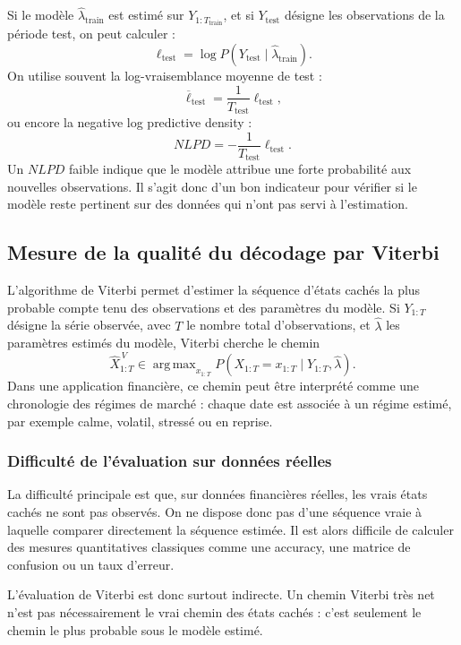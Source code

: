 \documentclass[11pt]{article}
\begin{document}
Si le modèle \(\widehat{\lambda}_{\text{train}}\) est estimé sur \(Y_{1:T_{\text{train}}}\), et si \(Y_{\text{test}}\) désigne les observations de la période test, on peut calculer :
\[
\ell_{\text{test}}
=
\log P(Y_{\text{test}}\mid \widehat{\lambda}_{\text{train}}).
\]
On utilise souvent la log-vraisemblance moyenne de test :
\[
\overline{\ell}_{\text{test}}
=
\frac{1}{T_{\text{test}}}\ell_{\text{test}},
\]
ou encore la negative log predictive density :
\[
NLPD
=
-\frac{1}{T_{\text{test}}}\ell_{\text{test}}.
\]
Un \(NLPD\) faible indique que le modèle attribue une forte probabilité aux nouvelles observations. Il s'agit donc d'un bon indicateur pour vérifier si le modèle reste pertinent sur des données qui n'ont pas servi à l'estimation.


\subsection{Mesure de la qualité du décodage par Viterbi}

L'algorithme de Viterbi permet d'estimer la séquence d'états cachés la plus probable compte tenu des observations et des paramètres du modèle. Si \(Y_{1:T}\) désigne la série observée, avec \(T\) le nombre total d'observations, et \(\widehat{\lambda}\) les paramètres estimés du modèle, Viterbi cherche le chemin
\[
\widehat{X}_{1:T}^{\,V}
\in
\mathop{\mathrm{arg\,max}}_{x_{1:T}}
P(X_{1:T}=x_{1:T}\mid Y_{1:T},\widehat{\lambda}).
\]
Dans une application financière, ce chemin peut être interprété comme une chronologie des régimes de marché : chaque date est associée à un régime estimé, par exemple calme, volatil, stressé ou en reprise.

\subsubsection{Difficulté de l'évaluation sur données réelles}

La difficulté principale est que, sur données financières réelles, les vrais états cachés ne sont pas observés. On ne dispose donc pas d'une séquence vraie à laquelle comparer directement la séquence estimée. Il est alors difficile de calculer des mesures quantitatives classiques comme une accuracy, une matrice de confusion ou un taux d'erreur.

L'évaluation de Viterbi est donc surtout indirecte. Un chemin Viterbi très net n'est pas nécessairement le vrai chemin des états cachés : c'est seulement le chemin le plus probable sous le modèle estimé.
\end{document}
